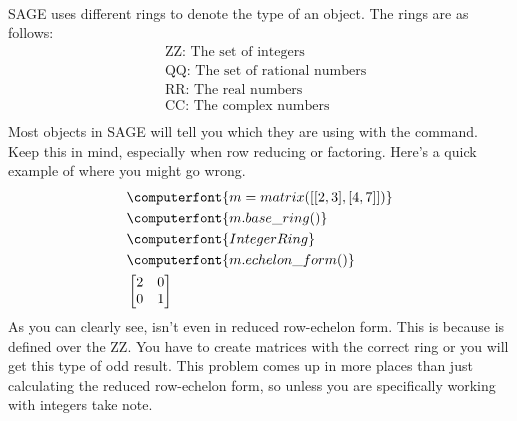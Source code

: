 \contributedby{\stevecanfield}\\
SAGE uses different rings to denote the type of an object. The rings are as follows:\\
\begin{align*}
&\text{ZZ: The set of integers}\\
&\text{QQ: The set of rational numbers}\\
&\text{RR: The real numbers}\\
&\text{CC: The complex numbers}\\
\end{align*}
Most objects in SAGE will tell you which they are using with the  command. Keep this in mind, especially when row reducing or factoring. Here's a quick example of where you might go wrong.
\begin{align*}
&\computerfont{m = matrix([[2,3],[4,7]])}\\
&\computerfont{m.base\_ring()}\\
&\computerfont{Integer Ring}\\
&\computerfont{m.echelon\_form()}\\
&\begin{bmatrix}
2 & 0 \\
0 & 1
\end{bmatrix}
\end{align*}
As you can clearly see,  isn't even in reduced row-echelon form. This is because  is defined over the ZZ. You have to create matrices with the correct ring or you will get this type of odd result. This problem comes up in more places than just calculating the reduced row-echelon form, so unless you are specifically working with integers take note.